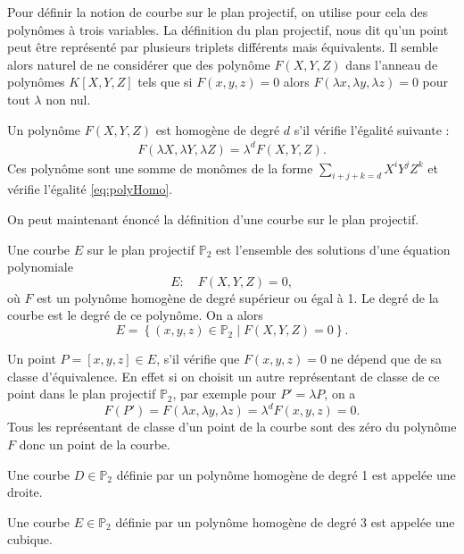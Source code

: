 Pour définir la notion de courbe sur le plan projectif, on utilise pour cela des polynômes à
trois variables. La définition du plan projectif, nous dit qu'un point peut être représenté par
plusieurs triplets différents mais équivalents. Il semble alors naturel de ne considérer
que des polynôme $F(X,Y,Z)$ dans l'anneau de polynômes $K[X,Y,Z]$ tels que si $F(x,y,z) = 0$ alors $F(\lambda x, \lambda
y, \lambda z) = 0$ pour tout $\lambda$ non nul.

\begin{definition}
    \label{polyHomo}
    
    Un polynôme $F(X,Y,Z)$ est homogène de degré $d$ s'il vérifie l'égalité suivante :
    \begin{align}
        \label{eq:polyHomo}
    F(\lambda X, \lambda Y, \lambda Z) = \lambda^{d}F(X,Y,Z)
    .\end{align}
    Ces polynôme sont une somme de monômes de la forme $\sum_{i+j+k=d} X^{i}Y^{j}Z^{k}$
    et vérifie l'égalité \eqref{eq:polyHomo}.
\end{definition}

On peut maintenant énoncé la définition d'une courbe sur le plan projectif.

\begin{definition}
    \label{def:courbeP2}
    Une courbe $E$ sur le plan projectif $\mathbb{P}_{2}$ est l'ensemble des solutions d'une
    équation polynomiale 
    \[
    E : \quad F(X,Y,Z)=0
    ,\] 
    où $F$ est un polynôme homogène de degré supérieur ou égal à 1. Le degré de la courbe
    est le degré de ce polynôme. On a alors 
    \[
    E = \left\{ (x,y,z) \in \mathbb{P}_{2} \mid F(X,Y,Z)=0 \right\} 
    .\] 
\end{definition}


Un point $P = [x,y,z] \in E$, s'il vérifie que $F(x,y,z)=0$ ne dépend que de sa classe
d'équivalence. En effet si on choisit un autre
représentant de classe de ce point dans le plan projectif $\mathbb{P}_{2}$, par exemple pour
$P'=\lambda P$, on a
\[
F(P')=F(\lambda x, \lambda y, \lambda z) = \lambda^{d}F(x,y,z) = 0
.\] 
Tous les représentant de classe d'un point de la courbe sont des zéro du polynôme $F$ donc un
point de la courbe.

\begin{definition}
    \label{def:cubique}
    
    Une courbe $D \in \mathbb{P}_{2}$ définie par un polynôme homogène de degré 1 est appelée
    une droite.

    Une courbe $E \in \mathbb{P}_{2}$ définie par un polynôme homogène de degré $3$ est appelée
    une cubique.
\end{definition}

